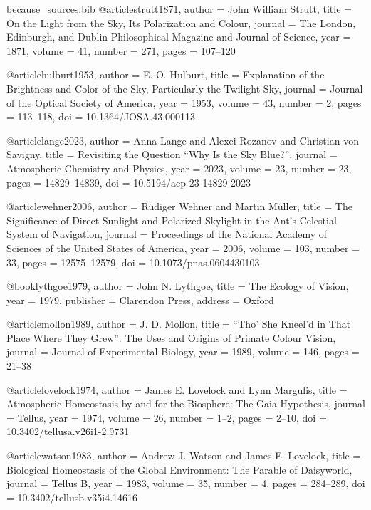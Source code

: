 \begin{filecontents*}{because_sources.bib}
@article{strutt1871,
  author  = {John William Strutt},
  title   = {On the Light from the Sky, Its Polarization and Colour},
  journal = {The London, Edinburgh, and Dublin Philosophical Magazine and Journal of Science},
  year    = {1871},
  volume  = {41},
  number  = {271},
  pages   = {107--120}
}

@article{hulburt1953,
  author  = {E. O. Hulburt},
  title   = {Explanation of the Brightness and Color of the Sky, Particularly the Twilight Sky},
  journal = {Journal of the Optical Society of America},
  year    = {1953},
  volume  = {43},
  number  = {2},
  pages   = {113--118},
  doi     = {10.1364/JOSA.43.000113}
}

@article{lange2023,
  author  = {Anna Lange and Alexei Rozanov and Christian von Savigny},
  title   = {Revisiting the Question ``Why Is the Sky Blue?''},
  journal = {Atmospheric Chemistry and Physics},
  year    = {2023},
  volume  = {23},
  number  = {23},
  pages   = {14829--14839},
  doi     = {10.5194/acp-23-14829-2023}
}

@article{wehner2006,
  author  = {R\"udiger Wehner and Martin M\"uller},
  title   = {The Significance of Direct Sunlight and Polarized Skylight in the Ant's Celestial System of Navigation},
  journal = {Proceedings of the National Academy of Sciences of the United States of America},
  year    = {2006},
  volume  = {103},
  number  = {33},
  pages   = {12575--12579},
  doi     = {10.1073/pnas.0604430103}
}

@book{lythgoe1979,
  author    = {John N. Lythgoe},
  title     = {The Ecology of Vision},
  year      = {1979},
  publisher = {Clarendon Press},
  address   = {Oxford}
}

@article{mollon1989,
  author  = {J. D. Mollon},
  title   = {``Tho' She Kneel'd in That Place Where They Grew'': The Uses and Origins of Primate Colour Vision},
  journal = {Journal of Experimental Biology},
  year    = {1989},
  volume  = {146},
  pages   = {21--38}
}

@article{lovelock1974,
  author  = {James E. Lovelock and Lynn Margulis},
  title   = {Atmospheric Homeostasis by and for the Biosphere: The Gaia Hypothesis},
  journal = {Tellus},
  year    = {1974},
  volume  = {26},
  number  = {1--2},
  pages   = {2--10},
  doi     = {10.3402/tellusa.v26i1-2.9731}
}

@article{watson1983,
  author  = {Andrew J. Watson and James E. Lovelock},
  title   = {Biological Homeostasis of the Global Environment: The Parable of Daisyworld},
  journal = {Tellus B},
  year    = {1983},
  volume  = {35},
  number  = {4},
  pages   = {284--289},
  doi     = {10.3402/tellusb.v35i4.14616}
}


\end{filecontents*}
